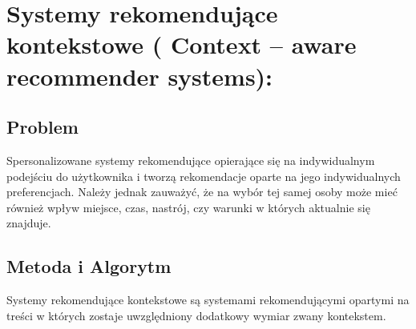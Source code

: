 \documentclass[12pt,a4paper]{report}
\begin{document}
{\section{Systemy rekomendujące kontekstowe ( Context – aware recommender systems):}

\subsection{Problem}
Spersonalizowane systemy rekomendujące opierające się na  indywidualnym podejściu do użytkownika i tworzą  rekomendacje oparte na jego indywidualnych preferencjach. Należy jednak zauważyć, że na wybór tej samej osoby może mieć również wpływ miejsce, czas, nastrój, czy warunki w których aktualnie się znajduje. 

\subsection{Metoda i Algorytm}
Systemy rekomendujące kontekstowe są systemami rekomendującymi opartymi na treści w których zostaje uwzględniony dodatkowy wymiar zwany kontekstem.

}
\end{document}
